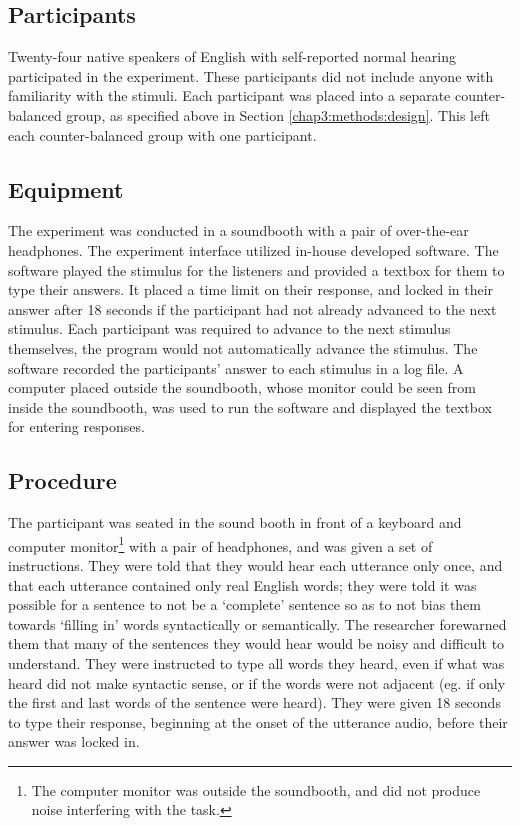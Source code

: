 \subsection{Participants}
\label{chap3:methods:participants}

Twenty-four native speakers of English with self-reported normal hearing participated in the experiment. These participants did not include anyone with familiarity with the stimuli.  Each participant was placed into a separate counter-balanced group, as specified above in Section \ref{chap3:methods:design}.  This left each counter-balanced group with one participant.

\subsection{Equipment}
\label{chap3:methods:equipment}

The experiment was conducted in a soundbooth with a pair of over-the-ear headphones.  The experiment interface utilized in-house developed software.  The software played the stimulus for the listeners and provided a textbox for them to type their answers.  It placed a time limit on their response, and locked in their answer after 18 seconds if the participant had not already advanced to the next stimulus. Each participant was required to advance to the next stimulus themselves, the program would not automatically advance the stimulus.  The software recorded the participants' answer to each stimulus in a log file.  A computer placed outside the soundbooth, whose monitor could be seen from inside the soundbooth, was used to run the software and displayed the textbox for entering responses.

\subsection{Procedure}
\label{chap3:methods:procedure}

The participant was seated in the sound booth in front of a keyboard and computer monitor\footnote{The computer monitor was outside the soundbooth, and did not produce noise interfering with the task.} with a pair of headphones, and was given a set of instructions. They were told that they would hear each utterance only once, and that each utterance contained only real English words; they were told it was possible for a sentence to not be a `complete' sentence so as to not bias them towards `filling in' words syntactically or semantically.  The researcher forewarned them that many of the sentences they would hear would be noisy and difficult to understand. They were instructed to type all words they heard, even if what was heard did not make syntactic sense, or if the words were not adjacent (eg. if only the first and last words of the sentence were heard). They were given 18 seconds to type their response, beginning at the onset of the utterance audio, before their answer was locked in.

